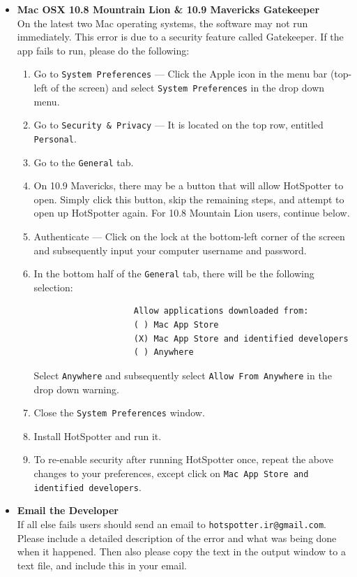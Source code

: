 \documentclass[a4paper,10pt]{article}
\makeatletter
\newcommand{\developeremail}{{\tt hotspotter.ir@gmail.com}}
\makeatother
\begin{document}
\begin{itemize}
    \item \textbf{Mac OSX 10.8 Mountrain Lion \& 10.9 Mavericks Gatekeeper}\\
      On the latest two Mac operating systems, the software may not run immediately.
      This error is due to a security feature called Gatekeeper.  If the app
      fails to run, please do the following:
        \begin{enumerate}
            \item Go to {\tt System Preferences} --- Click the Apple icon in the menu bar (top-left of the screen) and select {\tt System Preferences} in the drop down menu.
            \item Go to {\tt Security \& Privacy} --- It is located on the top row, entitled {\tt Personal}.
            \item Go to the {\tt General} tab.
	  \item On 10.9 Mavericks, there may be a button that will allow HotSpotter to open.  Simply click this button, skip the remaining steps, and attempt to open up HotSpotter again.  For 10.8 Mountain Lion users, continue below.
            \item Authenticate --- Click on the lock at the bottom-left corner of the screen and subsequently input your computer username and password.
            \item In the bottom half of the {\tt General} tab, there will be the following selection:
                \begin{Verbatim}
                    Allow applications downloaded from:
                    ( ) Mac App Store
                    (X) Mac App Store and identified developers
                    ( ) Anywhere

                \end{Verbatim}

                Select {\tt Anywhere} and subsequently select {\tt Allow From Anywhere} in the drop down warning.

            \item Close the {\tt System Preferences} window.
            \item Install HotSpotter and run it.
            \item To re-enable security after running HotSpotter once,
                repeat the above changes to your preferences, except click on
                \texttt{Mac App Store and identified developers}.
        \end{enumerate}


    \item \textbf{Email the Developer}\\
        If all else fails users should send an email to \developeremail{}.
        Please include a detailed description of the error and what was being done when it
            happened.  Then also please copy the text in the output window to a text file, and include this in your email.\\
    \end{itemize}
\end{document}
